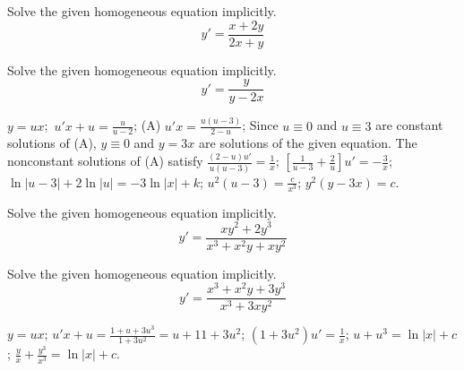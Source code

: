 \documentclass{ximera}
\begin{document}
\begin{problem}\label{exer:2.4.31}  Solve the given homogeneous equation implicitly.
$$y'=\frac{x+2y}{2x+y}$$
\end{problem}

\begin{problem}\label{exer:2.4.32}  Solve the given homogeneous equation implicitly.
$$y'=\frac{y}{y-2x}$$



\begin{solution}
    $y=ux$;\ $u'x+u=\frac{u}{ u-2}$;\;
(A)  $u'x=\frac{u(u-3)}{2-u}$;\;
Since $u\equiv0$ and $u\equiv3$
are constant solutions of (A), $y\equiv0$ and
$y=3x$ are solutions of the given equation.
The nonconstant solutions of (A) satisfy
$\frac{(2-u)u'}{ u(u-3)}=\frac{1}{ x}$;\;
$\left[\frac{1}{ u-3}+\frac{2}{
u}\right]u'=-\frac{3}{ x}$;\;
$\ln|u-3|+2\ln|u|=-3\ln|x|+k$;\;
$u^2(u-3)=\frac{c}{ x^3}$;\;
$y^2(y-3x)=c$.
\end{solution}
\end{problem}

\begin{problem}\label{exer:2.4.33} Solve the given homogeneous equation implicitly.
$$y'=\frac{xy^2+2y^3}{x^3+x^2y+xy^2}$$
\end{problem}

\begin{problem}\label{exer:2.4.34} Solve the given homogeneous equation implicitly.
$$y'=\frac{x^3+x^2y+3y^3}{x^3+3xy^2}$$



\begin{solution}
    $y=ux$;\;
$u'x+u=
\frac {1+u+3u^3 }{ 1+3u^2}=u+{1 }{ 1+3u^2}$;\;
$(1+3u^2)u'=\frac{1}{ x}$;\;
$u+u^3=\ln |x|+c$;\;
$\frac{y}{ x}+\frac{y^3}{ x^3}=\ln |x|+c$.
\end{solution}
\end{problem}
\end{document}
